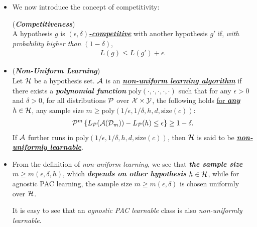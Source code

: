 \documentclass[11pt]{article}
\begin{document}
\begin{itemize}
\item We now introduce the concept of competitivity:
\begin{definition} (\emph{\textbf{Competitiveness}}) \\
A hypothesis $g$ is \underline{\emph{\textbf{$(\epsilon, \delta)$-competitive}}} with another hypothesis $g'$ if, \emph{with probability higher than} $(1 - \delta)$,
\begin{align*}
L(g) \le L(g') + \epsilon.
\end{align*}
\end{definition}

\item  \begin{definition} (\emph{\textbf{Non-Uniform Learning}})\\
Let ${\mathcal H}$ be a hypothesis set. ${\mathcal A}$ is an \underline{\emph{\textbf{non-uniform learning algorithm}}} if there
exists a \emph{\textbf{polynomial function}} $\text{poly}(\cdot, \cdot, \cdot, \cdot, \cdot)$  such that for any $\epsilon > 0$ and $\delta > 0$,
for all distributions ${\mathcal P}$ over ${\mathcal X} \times {\mathcal Y}$, the following holds \underline{for \textbf{\emph{any}} $h \in {\mathcal H}$}, any sample size $m \ge \text{poly}(1/\epsilon, 1/\delta, h, d, \text{size}(c))$:
\begin{align}
{\mathcal P}^{m}\left\{L_{{\mathcal P}}({\mathcal A}({\mathcal D}_{m})) - L_{{\mathcal P}}(h)  \le \epsilon \right\} \ge 1 - \delta. \label{eqn: agnostic_pac_definition}
\end{align} If ${\mathcal A}$ further runs in $\text{poly}(1/\epsilon, 1/\delta, h, d, \text{size}(c))$, then ${\mathcal H}$ is said to be \emph{\textbf{\underline{non-uniformly learnable}}}. 
\end{definition}

\item \begin{remark}
From the definition of \emph{non-uniform learning}, we see that \emph{\textbf{the sample size}} $m \ge m(\epsilon, \delta, h)$, which \emph{\textbf{depends on other hypothesis}} $h \in {\mathcal H}$, while for agnostic PAC learning, the sample size $m \ge m(\epsilon, \delta)$ is chosen uniformly over ${\mathcal H}$. 

It is easy to see that an \emph{agnostic PAC learnable} class is also \emph{non-uniformly learnable}.
\end{remark}
\end{itemize}
\end{document}
